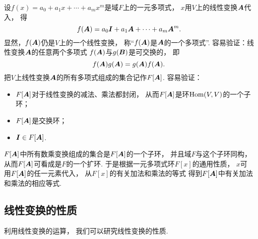 设\(f(x)=a_0+a_1 x+\dotsb+a_m x^m\)是域\(F\)上的一元多项式，
\(x\)用\(V\)上的线性变换\(\boldsymbol{A}\)代入，
得\[
	f(\boldsymbol{A})=a_0\boldsymbol{I}+a_1\boldsymbol{A}+\dotsb+a_m\boldsymbol{A}^m.
\]
显然，\(f(\boldsymbol{A})\)仍是\(V\)上的一个线性变换，
称“\(f(\boldsymbol{A})\)是\(\boldsymbol{A}\)的一个多项式”.
容易验证：线性变换\(\boldsymbol{A}\)的任意两个多项式
\(f(\boldsymbol{A})\)与\(g(\boldsymbol{B})\)是可交换的，
即\[
	f(\boldsymbol{A}) g(\boldsymbol{A})
	=g(\boldsymbol{A}) f(\boldsymbol{A}).
\]
把\(V\)上线性变换\(\boldsymbol{A}\)的所有多项式组成的集合记作\(F[\boldsymbol{A}]\).
容易验证：
\begin{itemize}
	\item \(F[\boldsymbol{A}]\)对于线性变换的减法、乘法都封闭，
	从而\(F[\boldsymbol{A}]\)是环\(\operatorname{Hom}(V,V)\)的一个子环；

	\item \(F[\boldsymbol{A}]\)是交换环；

	\item \(\boldsymbol{I}\in F[\boldsymbol{A}]\).
\end{itemize}
\(F[\boldsymbol{A}]\)中所有数乘变换组成的集合是\(F[\boldsymbol{A}]\)的一个子环，
并且域\(F\)与这个子环同构，
从而\(F[\boldsymbol{A}]\)可看成是\(F\)的一个扩环.
于是根据一元多项式环\(F[x]\)的通用性质，
\(x\)可用\(F[\boldsymbol{A}]\)的任一元素代入，
从\(F[x]\)的有关加法和乘法的等式
得到\(F[\boldsymbol{A}]\)中有关加法和乘法的相应等式.

\subsection{线性变换的性质}
利用线性变换的运算，
我们可以研究线性变换的性质.


